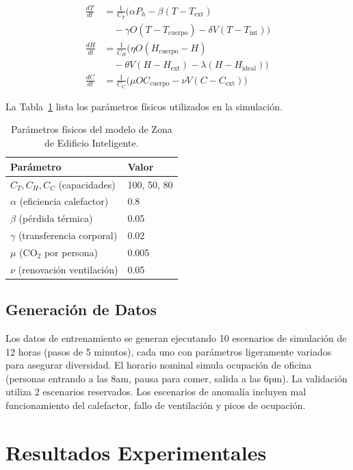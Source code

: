 \documentclass[conference]{IEEEtran}
\begin{document}
\begin{align}
\frac{dT}{dt} &= \frac{1}{C_T}\big(\alpha P_h - \beta(T - T_{\text{ext}}) \nonumber \\
&\quad - \gamma O(T - T_{\text{cuerpo}}) - \delta V(T - T_{\text{int}})\big) \label{eq:dT} \\
\frac{dH}{dt} &= \frac{1}{C_H}\big(\eta O(H_{\text{cuerpo}} - H) \nonumber \\
&\quad - \theta V(H - H_{\text{ext}}) - \lambda(H - H_{\text{ideal}})\big) \label{eq:dH} \\
\frac{dC}{dt} &= \frac{1}{C_C}\big(\mu O C_{\text{cuerpo}} - \nu V(C - C_{\text{ext}})\big) \label{eq:dC}
\end{align}

La Tabla~\ref{tab:params} lista los parámetros físicos utilizados en la simulación.

\begin{table}[t]
\centering
\caption{Parámetros físicos del modelo de Zona de Edificio Inteligente.}
\label{tab:params}
\small
\begin{tabular}{ll}
\toprule
\textbf{Parámetro} & \textbf{Valor} \\
\midrule
$C_T, C_H, C_C$ (capacidades) & 100, 50, 80 \\
$\alpha$ (eficiencia calefactor) & 0.8 \\
$\beta$ (pérdida térmica) & 0.05 \\
$\gamma$ (transferencia corporal) & 0.02 \\
$\mu$ (CO$_2$ por persona) & 0.005 \\
$\nu$ (renovación ventilación) & 0.05 \\
\bottomrule
\end{tabular}
\end{table}

\subsection{Generación de Datos}
Los datos de entrenamiento se generan ejecutando 10 escenarios de simulación de 12 horas (pasos de 5 minutos), cada uno con parámetros ligeramente variados para asegurar diversidad. El horario nominal simula ocupación de oficina (personas entrando a las 8am, pausa para comer, salida a las 6pm). La validación utiliza 2 escenarios reservados. Los escenarios de anomalía incluyen mal funcionamiento del calefactor, fallo de ventilación y picos de ocupación.

\section{Resultados Experimentales}
\label{sec:resultados}
\end{document}
